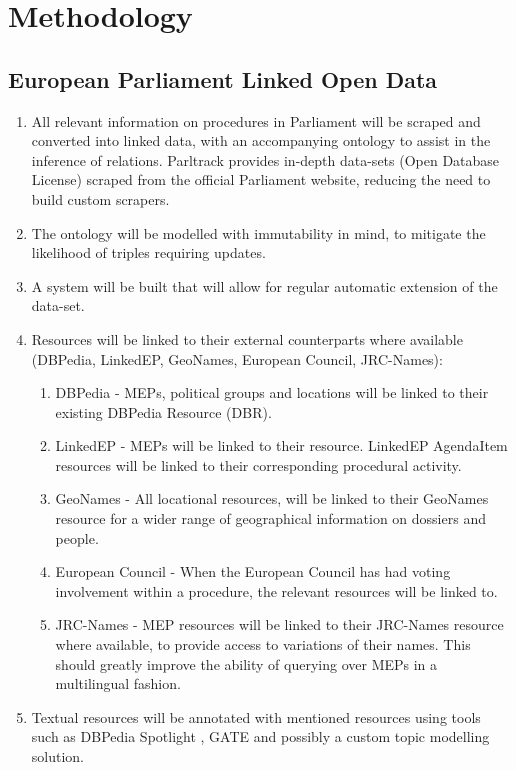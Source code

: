 \documentclass{article}
\begin{document}
\section{Methodology}
\subsection{European Parliament Linked Open Data} \label{methodLOD}
\begin{enumerate}
    \item All relevant information on procedures in Parliament will be scraped and converted into linked data, with an accompanying ontology to assist in the inference of relations. 
Parltrack provides in-depth data-sets \cite{parltrackSchema} (Open Database License) scraped from the official Parliament website, reducing the need to build custom scrapers.
    \item The ontology will be modelled with immutability in mind, to mitigate the likelihood of triples requiring updates.
    \item A system will be built that will allow for regular automatic extension of the data-set.
    \item Resources will be linked to their external counterparts where available (DBPedia, LinkedEP, GeoNames, European Council, JRC-Names):
    \begin{enumerate}
        \item DBPedia - MEPs, political groups and locations will be linked to their existing DBPedia Resource (DBR).
        \item LinkedEP - MEPs will be linked to their resource. LinkedEP AgendaItem resources will be linked to their corresponding procedural activity.
        \item GeoNames - All locational resources, will be linked to their GeoNames resource for a wider range of geographical information on dossiers and people.
        \item European Council - When the European Council has had voting involvement within a procedure, the relevant resources will be linked to.
        \item JRC-Names \cite{Ehrmann2017JRCNamesME} - MEP resources will be linked to their JRC-Names resource where available, to provide access to variations of their names. This 
should greatly improve the ability of querying over MEPs in a multilingual fashion.
    \end{enumerate}
    \item Textual resources will be annotated with mentioned resources using tools such as DBPedia Spotlight \cite{isem2013daiber}, GATE \cite{} and possibly a custom topic modelling 
solution.
\end{enumerate}
\end{document}
